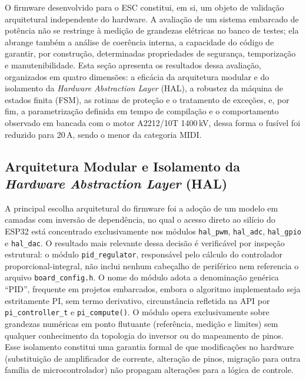 O firmware desenvolvido para o ESC constitui, em si, um objeto de validação arquitetural independente do hardware. A avaliação de um sistema embarcado de potência não se restringe à medição de grandezas elétricas no banco de testes; ela abrange também a análise de coerência interna, a capacidade do código de garantir, por construção, determinadas propriedades de segurança, temporização e manutenibilidade. Esta seção apresenta os resultados dessa avaliação, organizados em quatro dimensões: a eficácia da arquitetura modular e do isolamento da \textit{Hardware Abstraction Layer} (HAL), a robustez da máquina de estados finita (FSM), as rotinas de proteção e o tratamento de exceções, e, por fim, a parametrização definida em tempo de compilação e o comportamento observado em bancada com o motor A2212/10T 1400\,kV, dessa forma o fusível foi reduzido para 20\,A, sendo o menor da categoria MIDI.

\subsection{Arquitetura Modular e Isolamento da \textit{Hardware Abstraction Layer} (HAL)}

A principal escolha arquitetural do firmware foi a adoção de um modelo em camadas com inversão de dependência, no qual o acesso direto ao silício do ESP32 está concentrado exclusivamente nos módulos \texttt{hal\_pwm}, \texttt{hal\_adc}, \texttt{hal\_gpio} e \texttt{hal\_dac}. O resultado mais relevante dessa decisão é verificável por inspeção estrutural: o módulo \texttt{pid\_regulator}, responsável pelo cálculo do controlador proporcional-integral, não inclui nenhum cabeçalho de periférico nem referencia o arquivo \texttt{board\_config.h}. O nome do módulo adota a denominação genérica ``PID'', frequente em projetos embarcados, embora o algoritmo implementado seja estritamente PI, sem termo derivativo, circunstância refletida na API por \texttt{pi\_controller\_t} e \texttt{pi\_compute()}. O módulo opera exclusivamente sobre grandezas numéricas em ponto flutuante (referência, medição e limites) sem qualquer conhecimento da topologia do inversor ou do mapeamento de pinos. Esse isolamento constitui uma garantia formal de que modificações no hardware (substituição de amplificador de corrente, alteração de pinos, migração para outra família de microcontrolador) não propagam alterações para a lógica de controle.

